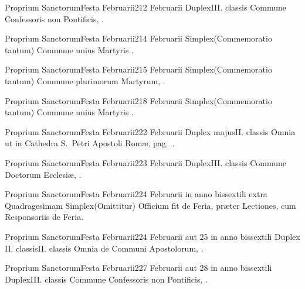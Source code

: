 \documentclass[nocturnale-romanum.tex]{subfiles}
\begin{document}
	{Proprium Sanctorum}{Festa Februarii}{2}{12 Februarii}
	{Duplex}{III. classis}
	{Commune Confessoris non Pontificis, \pageref{M-CONP}.}
	{}

	{Proprium Sanctorum}{Festa Februarii}{2}{14 Februarii}
	{Simplex}{(Commemoratio tantum)}
	{Commune unius Martyris \pageref{M-UMEX}.}
	{}

	{Proprium Sanctorum}{Festa Februarii}{2}{15 Februarii}
	{Simplex}{(Commemoratio tantum)}
	{Commune plurimorum Martyrum, \pageref{M-PMEX}.}
	{}

	{Proprium Sanctorum}{Festa Februarii}{2}{18 Februarii}
	{Simplex}{(Commemoratio tantum)}
	{Commune unius Martyris \pageref{M-UMEX}.}
	{}

	{Proprium Sanctorum}{Festa Februarii}{2}{22 Februarii}
	{Duplex majus}{II. classis}
	{Omnia ut in Cathedra S.\ Petri Apostoli Romæ, pag.\ \pageref{M-0118}.}
	{}

	{Proprium Sanctorum}{Festa Februarii}{2}{23 Februarii}
	{Duplex}{III. classis}
	{Commune Doctorum Ecclesiæ, \pageref{M-CODO}.}
	{}

	{Proprium Sanctorum}{Festa Februarii}{2}{24 Februarii in anno bissextili extra Quadragesimam}
	{Simplex}{(Omittitur)}
	{Officium fit de Feria, præter Lectiones, cum Responsoriis de Feria.}
	{}

	{Proprium Sanctorum}{Festa Februarii}{2}{24 Februarii aut 25 in anno bissextili}
	{Duplex II. classis}{II. classis}
	{Omnia de Communi Apostolorum, \pageref{M-APEX}.}
	{}

	{Proprium Sanctorum}{Festa Februarii}{2}{27 Februarii aut 28 in anno bissextili}
	{Duplex}{III. classis}
	{Commune Confessoris non Pontificis, \pageref{M-CONP}.}
	{}
\end{document}

